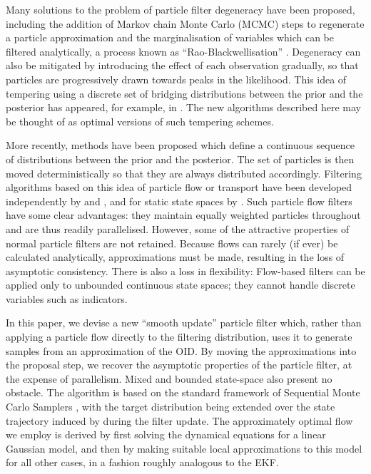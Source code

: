 \documentclass[a4paper,10pt]{article}
\begin{document}
Many solutions to the problem of particle filter degeneracy have been proposed, including the addition of Markov chain Monte Carlo (MCMC) steps to regenerate a particle approximation \cite{Gilks2001} and the marginalisation of variables which can be filtered analytically, a process known as ``Rao-Blackwellisation'' \cite{Casella1996,Doucet2000}. Degeneracy can also be mitigated by introducing the effect of each observation gradually, so that particles are progressively drawn towards peaks in the likelihood. This idea of tempering using a discrete set of bridging distributions between the prior and the posterior has appeared, for example, in \cite{Godsill2001b}. The new algorithms described here may be thought of as optimal versions of such tempering schemes.

More recently, methods have been proposed which define a continuous sequence of distributions between the prior and the posterior. The set of particles is then moved deterministically so that they are always distributed accordingly. Filtering algorithms based on this idea of particle flow or transport have been developed independently by \cite{Daum2008,Daum2011d} and \cite{Reich2011}, and for static state spaces by \cite{Moselhy2012}. Such particle flow filters have some clear advantages: they maintain equally weighted particles throughout and are thus readily parallelised. However, some of the attractive properties of normal particle filters are not retained. Because flows can rarely (if ever) be calculated analytically, approximations must be made, resulting in the loss of asymptotic consistency. There is also a loss in flexibility: Flow-based filters can be applied only to unbounded continuous state spaces; they cannot handle discrete variables such as indicators.

In this paper, we devise a new ``smooth update'' particle filter which, rather than applying a particle flow directly to the filtering distribution, uses it to generate samples from an approximation of the OID. By moving the approximations into the proposal step, we recover the asymptotic properties of the particle filter, at the expense of parallelism. Mixed and bounded state-space also present no obstacle. The algorithm is based on the standard framework of Sequential Monte Carlo Samplers \cite{DelMoral2006}, with the target distribution being extended over the state trajectory induced by during the filter update. The approximately optimal flow we employ is derived by first solving the dynamical equations for a linear Gaussian model, and then by making suitable local approximations to this model for all other cases, in a fashion roughly analogous to the EKF.
\end{document}
